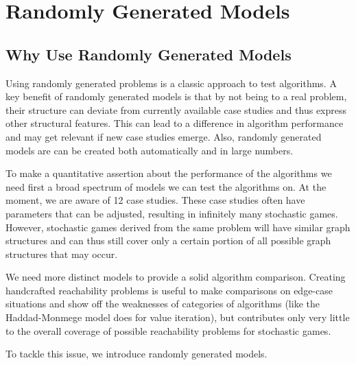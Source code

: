 \chapter{Randomly Generated Models} \label{ch:randomGen}
\section{Why Use Randomly Generated Models}
Using randomly generated problems is a classic approach to test algorithms.
A key benefit of randomly generated models is that by not being to a real problem, their structure can deviate from currently available case studies 
and thus express other structural features. 
This can lead to a difference in algorithm performance and may get relevant if new case studies emerge.
Also, randomly generated models are can be created both automatically and in large numbers.

To make a quantitative assertion about the performance of the algorithms we need first a broad spectrum of models we can test the algorithms on.
At the moment, we are aware of 12 case studies.
These case studies often have parameters that can be adjusted, resulting in infinitely many stochastic games.
However, stochastic games derived from the same problem will have similar graph structures and can thus still cover only a certain portion
of all possible graph structures that may occur.

We need more distinct models to provide a solid algorithm comparison.
Creating handcrafted reachability problems is useful to make comparisons on edge-case situations and 
show off the weaknesses of categories of algorithms (like the Haddad-Monmege model does for value iteration), 
but contributes only very little to the overall coverage of possible reachability problems for stochastic games.

To tackle this issue, we introduce randomly generated models.


